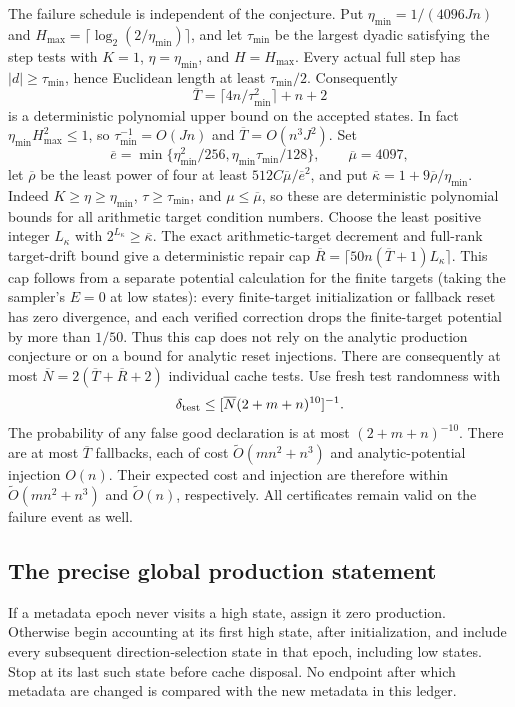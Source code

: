 \documentclass[11pt]{amsart}
\theoremstyle{definition}\newtheorem{definition}[theorem]{Definition}
\theoremstyle{remark}\newtheorem{remark}[theorem]{Remark}
\numberwithin{equation}{section}
\begin{document}
The failure schedule is independent of the conjecture.
Put $\eta_{\min}=1/(4096Jn)$ and $H_{\max}=\lceil\log_2(2/\eta_{\min})\rceil$,
and let $\tau_{\min}$ be the largest dyadic satisfying the step tests with
$K=1$, $\eta=\eta_{\min}$, and $H=H_{\max}$. Every actual full step has
$|d|\ge\tau_{\min}$, hence Euclidean length at least $\tau_{\min}/2$.
Consequently
\[
 \overline T=\lceil4n/\tau_{\min}^2\rceil+n+2
\]
is a deterministic polynomial upper bound on the accepted states.
In fact $\eta_{\min}H_{\max}^2\le1$, so
$\tau_{\min}^{-1}=O(Jn)$ and $\overline T=O(n^3J^2)$.
Set
\[
 \overline e=\min\{\eta_{\min}^2/256,
                         \eta_{\min}\tau_{\min}/128\},\qquad
 \overline\mu=4097,
\]
let $\overline\rho$ be the least power of four at least
$512C\overline\mu/\overline e^2$, and put
$\overline\kappa=1+9\overline\rho/\eta_{\min}$.
Indeed $K\ge\eta\ge\eta_{\min}$, $\tau\ge\tau_{\min}$, and
$\mu\le\overline\mu$, so these are deterministic polynomial bounds for
all arithmetic target condition numbers. Choose the least positive
integer $L_\kappa$ with $2^{L_\kappa}\ge\overline\kappa$.
The exact arithmetic-target decrement and full-rank target-drift bound
give a deterministic repair cap
$\overline R=\lceil50n(\overline T+1)L_\kappa\rceil$.
This cap follows from a separate potential calculation for the finite targets (taking the sampler's
$E=0$ at low states): every finite-target initialization or fallback
reset has zero divergence, and each verified correction drops the
finite-target potential by more than $1/50$. Thus this cap does not rely
on the analytic production conjecture or on a bound for analytic reset
injections.
There are consequently at most
$\overline N=2(\overline T+\overline R+2)$ individual cache tests.
Use fresh test randomness with
\begin{equation}\label{d:failure}
 \delta_{\rm test}\le[\overline N(2+m+n)^{10}]^{-1}.
\end{equation}
The probability of any false good declaration is at most
$(2+m+n)^{-10}$. There are at most $\overline T$ fallbacks, each of cost
$\widetilde O(mn^2+n^3)$ and analytic-potential injection $O(n)$.
Their expected cost and injection are therefore within
$\widetilde O(mn^2+n^3)$ and $\widetilde O(n)$, respectively. All
certificates remain valid on the failure event as well.

\subsection{The precise global production statement}\label{d:production}
If a metadata epoch never visits a high state, assign it zero production.
Otherwise begin accounting at its first high state, after initialization,
and include every subsequent direction-selection state in that epoch,
including low states. Stop at its last such state before cache disposal.
No endpoint after which metadata are changed is compared with the new
metadata in this ledger.
\end{document}
